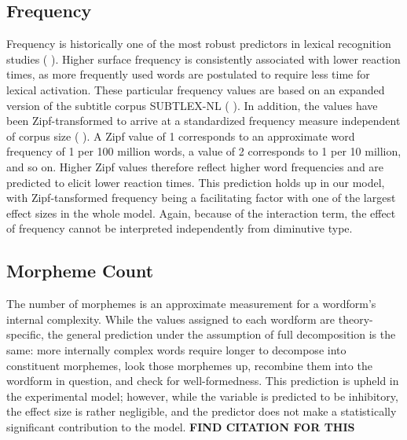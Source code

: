 \subsection{Frequency} \label{subsec:freq}
Frequency is historically one of the most robust predictors in lexical recognition studies (\citeauthor{Brysbaert+etal+2016} \citeyear{Brysbaert+etal+2016}). Higher surface frequency is consistently associated with lower reaction times, as more frequently used words are postulated to require less time for lexical activation. These particular frequency values are based on an expanded version of the subtitle corpus SUBTLEX-NL (\citeauthor{Keuleers+etal+2010} \citeyear{Keuleers+etal+2010}). In addition, the values have been Zipf-transformed to arrive at a standardized frequency measure independent of corpus size (\citeauthor{vanHeuven+etal+2014} \citeyear{vanHeuven+etal+2014}). A Zipf value of 1 corresponds to an approximate word frequency of 1 per 100 million words, a value of 2 corresponds to 1 per 10 million, and so on. Higher Zipf values therefore reflect higher word frequencies and are predicted to elicit lower reaction times. This prediction holds up in our model, with Zipf-tansformed frequency being a facilitating factor with one of the largest effect sizes in the whole model. Again, because of the interaction term, the effect of frequency cannot be interpreted independently from diminutive type.
\subsection{Morpheme Count} \label{subsec:nmorph}
The number of morphemes is an approximate measurement for a wordform's internal complexity. While the values assigned to each wordform are theory-specific, the general prediction under the assumption of full decomposition is the same: more internally complex words require longer to decompose into constituent morphemes, look those morphemes up, recombine them into the wordform in question, and check for well-formedness. This prediction is upheld in the experimental model; however, while the variable is predicted to be inhibitory, the effect size is rather negligible, and the predictor does not make a statistically significant contribution to the model. \textbf{FIND CITATION FOR THIS}
